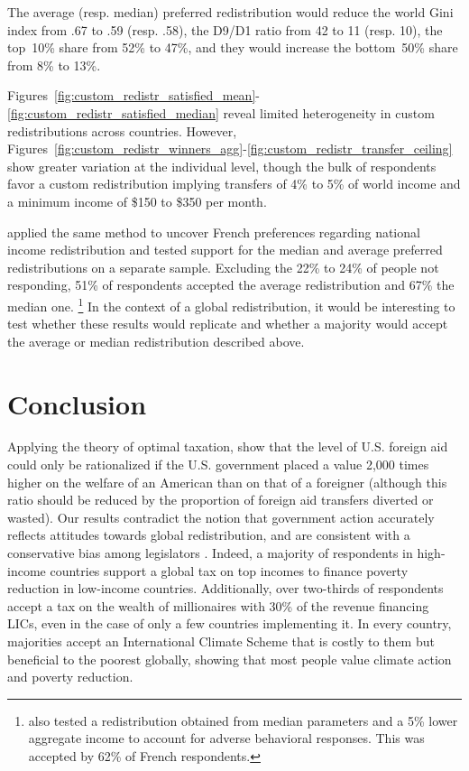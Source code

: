 \documentclass[12pt,english]{article}
\begin{document}
\begin{bibunit}
The average (resp. median) preferred redistribution would reduce the world Gini index from .67 to .59 (resp. .58), the D9/D1 ratio from 42 to 11 (resp. 10), the top~10\% share from 52\% to 47\%, and they would increase the bottom~50\% share from 8\% to 13\%.

Figures~\ref{fig:custom_redistr_satisfied_mean}-\ref{fig:custom_redistr_satisfied_median} reveal limited heterogeneity in custom redistributions across countries. However, Figures~\ref{fig:custom_redistr_winners_agg}-\ref{fig:custom_redistr_transfer_ceiling} show greater variation at the individual level, though the bulk of respondents favor a custom redistribution implying transfers of 4\% to 5\% of world income and a minimum income of \$150 to \$350 per month. 

\cite{fabre_french_2022} applied the same method to uncover French preferences regarding national income redistribution and tested support for the median and average %
preferred redistributions on a separate sample. Excluding the 22\% to 24\% of people not responding, 51\% of respondents accepted the average redistribution and 67\% the median one.%
\footnote{\cite{fabre_french_2022} also tested a redistribution obtained from median parameters and a 5\% lower aggregate income to account for adverse behavioral responses. This was accepted by 62\% of French respondents.} 
In the context of a global redistribution, it would be interesting to test whether these results would replicate and whether a majority would accept the average or median redistribution described above. 

\section{Conclusion} %

Applying the theory of optimal taxation, \cite{kopczuk_limitations_2005} show that the level of U.S. foreign aid could only be rationalized if the U.S. government placed a value 2,000 times higher on the welfare of an American than on that of a foreigner (although this ratio should be reduced by the proportion of foreign aid transfers diverted or wasted). 
Our results contradict the notion that government action accurately reflects attitudes towards global redistribution, and are consistent with a conservative bias among legislators \citep{gilens_testing_2014,broockman_bias_2018,pilet_politicians_2024}. 
Indeed, a majority of respondents in high-income countries support a global tax on top incomes to finance poverty reduction in low-income countries. Additionally, over two-thirds of respondents accept a tax on the wealth of millionaires with 30\% of the revenue financing LICs, even in the case of only a few countries implementing it. In every country, majorities accept an International Climate Scheme that is costly to them but beneficial to the poorest globally, showing that most people value climate action and poverty reduction. 


\end{bibunit}
\end{document}
